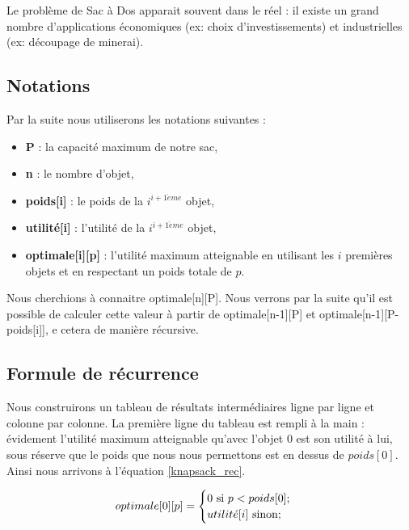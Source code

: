 Le problème de Sac à Dos apparait souvent dans le réel : il existe un grand nombre d'applications économiques (ex: choix d'investissements) et industrielles (ex: découpage de minerai).

\subsection{Notations}

Par la suite nous utiliserons les notations suivantes :

\begin{itemize}
\item \textbf{P} : la capacité maximum de notre sac,
\item \textbf{n} : le nombre d'objet,
\item \textbf{poids[i]} : le poids de la $i^{i+1\grave{e}me}$ objet,
\item \textbf{utilité[i]} : l'utilité de la $i^{i+1\grave{e}me}$ objet,
\item \textbf{optimale[i][p]} : l'utilité maximum atteignable en utilisant les $i$ premières objets et en respectant un poids totale de $p$.
\end{itemize} 

Nous cherchions à connaitre optimale[n][P]. Nous verrons par la suite qu'il est possible de calculer cette valeur à partir de optimale[n-1][P] et optimale[n-1][P-poids[i]], e cetera de manière récursive.

\subsection{Formule de récurrence}
Nous construirons un tableau de résultats intermédiaires ligne par ligne et colonne par colonne. La première ligne du tableau est rempli à la main : évidement l'utilité maximum atteignable qu'avec l'objet $0$ est son utilité à lui, sous réserve que le poids que nous nous permettons est en dessus de $poids[0]$. Ainsi nous arrivons à l'équation \ref{knapsack_rec}.

\begin{equation}
\label{knapsack_rec}
optimale[0][p] =
	\begin{cases}
		0 \text{ si } p < poids[0];	\\
		utilit\acute{e}[i] \text{ sinon};
	\end{cases} \\
\end{equation}

